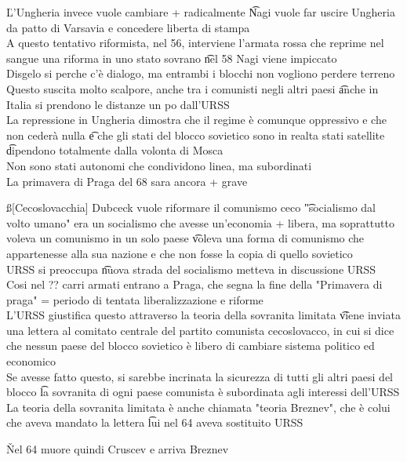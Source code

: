 \documentclass[12pt]{article}
\begin{document}
\v

L'Ungheria invece vuole cambiare + radicalmente \t Nagi vuole far uscire Ungheria da patto di Varsavia e concedere liberta di stampa \\
A questo tentativo riformista, nel 56, interviene l'armata rossa che reprime nel sangue una riforma in uno stato sovrano \t nel 58 Nagi viene impiccato \\
Disgelo si perche c'è dialogo, ma entrambi i blocchi non vogliono perdere terreno \\
Questo suscita molto scalpore, anche tra i comunisti negli altri paesi \t anche in Italia si prendono le distanze un po dall'URSS \\
La repressione in Ungheria dimostra che il regime è comunque oppressivo e che non cederà nulla \t e che gli stati del blocco sovietico sono in realta stati satellite \t dipendono totalmente dalla volonta di Mosca \\
Non sono stati autonomi che condividono linea, ma subordinati \\
La primavera di Praga del 68 sara ancora + grave

\ss[Cecoslovacchia]
Dubceck vuole riformare il comunismo ceco \t "socialismo dal volto umano" era un socialismo che avesse un'economia + libera, ma soprattutto voleva un comunismo in un solo paese \t voleva una forma di comunismo che appartenesse alla sua nazione e che non fosse la copia di quello sovietico \\
URSS si preoccupa \t nuova strada del socialismo metteva in discussione URSS \\
Cosi nel ?? carri armati entrano a Praga, che segna la fine della "Primavera di praga" = periodo di tentata liberalizzazione e riforme \\
L'URSS giustifica questo attraverso la teoria della sovranita limitata \t viene inviata una lettera al comitato centrale del partito comunista cecoslovacco, in cui si dice che nessun paese del blocco sovietico è libero di cambiare sistema politico ed economico \\
Se avesse fatto questo, si sarebbe incrinata la sicurezza di tutti gli altri paesi del blocco \t la sovranita di ogni paese comunista è subordinata agli interessi dell'URSS \\
La teoria della sovranita limitata è anche chiamata "teoria Breznev", che è colui che aveva mandato la lettera \t lui nel 64 aveva sostituito URSS

\v

Nel 64 muore quindi Cruscev e arriva Breznev
\end{document}
